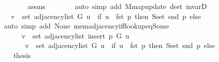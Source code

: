\begin{isabellebody}
\ \ \ \ \ \ \isamarkupfalse%
\ assms{\isacharparenleft}{\kern0pt}{}{\isacharparenright}{\kern0pt}\isanewline
\ \ \ \ \ \ \isamarkupfalse%
\ {\isacharparenleft}{\kern0pt}auto\ simp\ add{\isacharcolon}{\kern0pt}\ M{\isachardot}{\kern0pt}map{\isacharunderscore}{\kern0pt}update\ dest{\isacharcolon}{\kern0pt}\ invarD{\isacharparenleft}{\kern0pt}{}{\isacharparenright}{\kern0pt}{\isacharparenright}{\kern0pt}\isanewline
\ \ \ \ \isamarkupfalse%
\ \isamarkupfalse%
\ {\isachardoublequoteopen}{\isachardot}{\kern0pt}{\isachardot}{\kern0pt}{\isachardot}{\kern0pt}\ {\isasymlongleftrightarrow}\ v\ {\isasymin}\ set\ {\isacharparenleft}{\kern0pt}adjacency{\isacharunderscore}{\kern0pt}list\ G\ u{\isacharparenright}{\kern0pt}\ {\isasymunion}\ {\isacharparenleft}{\kern0pt}if\ u\ {\isacharequal}{\kern0pt}\ fst\ p\ then\ S{\isachardot}{\kern0pt}set\ {\isacharparenleft}{\kern0pt}snd\ p{\isacharparenright}{\kern0pt}\ else\ {\isacharbraceleft}{\kern0pt}{\isacharbraceright}{\kern0pt}{\isacharparenright}{\kern0pt}{\isachardoublequoteclose}\isanewline
\ \ \ \ \ \ \isamarkupfalse%
\ {\isacharparenleft}{\kern0pt}auto\ simp\ add{\isacharcolon}{\kern0pt}\ None\ mem{\isacharunderscore}{\kern0pt}adjacency{\isacharunderscore}{\kern0pt}iff{\isacharunderscore}{\kern0pt}lookup{\isacharunderscore}{\kern0pt}eq{\isacharunderscore}{\kern0pt}Some{\isacharparenright}{\kern0pt}\isanewline
\ \ \ \ \isamarkupfalse%
\ \isamarkupfalse%
\isanewline
\ \ \ \ \ \ {\isachardoublequoteopen}v\ {\isasymin}\ set\ {\isacharparenleft}{\kern0pt}adjacency{\isacharunderscore}{\kern0pt}list\ {\isacharparenleft}{\kern0pt}insert{\isacharunderscore}{\kern0pt}{}\ p\ G{\isacharparenright}{\kern0pt}\ u{\isacharparenright}{\kern0pt}\ {\isasymlongleftrightarrow}\isanewline
\ \ \ \ \ \ \ v\ {\isasymin}\ set\ {\isacharparenleft}{\kern0pt}adjacency{\isacharunderscore}{\kern0pt}list\ G\ u{\isacharparenright}{\kern0pt}\ {\isasymunion}\ {\isacharparenleft}{\kern0pt}if\ u\ {\isacharequal}{\kern0pt}\ fst\ p\ then\ S{\isachardot}{\kern0pt}set\ {\isacharparenleft}{\kern0pt}snd\ p{\isacharparenright}{\kern0pt}\ else\ {\isacharbraceleft}{\kern0pt}{\isacharbraceright}{\kern0pt}{\isacharparenright}{\kern0pt}{\isachardoublequoteclose}\isanewline
\ \ \ \ \ \ \isacommand{{\isachardot}{\kern0pt}}\isamarkupfalse%
\ \isacommand{{\isacharbraceright}{\kern0pt}}\isamarkupfalse%
\isanewline
\ \ \isamarkupfalse%
\ {\isacharquery}{\kern0pt}thesis\isanewline
\ \ \ \ \isamarkupfalse%

\end{isabellebody}

